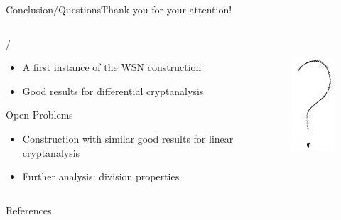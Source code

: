 \begin{frame}{Conclusion/Questions}{Thank you for your attention!}
    \begin{columns}
        \begin{column}{0.5\textwidth}
            \begin{block}{\bison/}
                \begin{itemize}
                    \item A first instance of the WSN construction
                    \item Good results for differential cryptanalysis
                \end{itemize}
            \end{block}
            \begin{block}{Open Problems}
                \begin{itemize}
                    \item Construction with similar good results for linear cryptanalysis
                    \item Further analysis: division properties
                \end{itemize}
            \end{block}
        \end{column}
        \begin{column}{0.39\textwidth}
        \begin{figure}[!htb]
            \includegraphics[height=50mm]{data/flickr/questionmark.png}
        \end{figure}
        \end{column}
    \end{columns}
\end{frame}

\begin{frame}[allowframebreaks]{References}
    \tiny
    \printbibliography{}
\end{frame}
